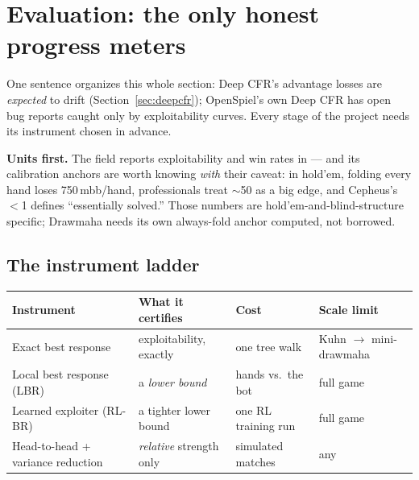\section{Evaluation: the only honest progress meters}\label{sec:evaluation}

One sentence organizes this whole section:  Deep CFR's advantage losses are \emph{expected} to drift (Section~\ref{sec:deepcfr}); OpenSpiel's own Deep CFR has open bug reports caught only by exploitability curves. Every stage of the project needs its instrument chosen in advance.

\textbf{Units first.} The field reports exploitability and win rates in  --- and its calibration anchors are worth knowing \emph{with} their caveat: in hold'em, folding every hand loses 750\,mbb/hand, professionals treat $\sim$50 as a big edge, and Cepheus's $<$1 defines ``essentially solved.'' Those numbers are hold'em-and-blind-structure specific; Drawmaha needs its own always-fold anchor computed, not borrowed.

\subsection*{The instrument ladder}

\begin{center}
\footnotesize
\begin{tabular}{@{}llll@{}}
\toprule
Instrument & What it certifies & Cost & Scale limit \\
\midrule
Exact best response & exploitability, exactly & one tree walk & Kuhn $\to$ mini-drawmaha \\
Local best response (LBR) & a \emph{lower bound} & hands vs.\ the bot & full game \\
Learned exploiter (RL-BR) & a tighter lower bound & one RL training run & full game \\
Head-to-head + variance reduction & \emph{relative} strength only & simulated matches & any \\
\bottomrule
\end{tabular}
\end{center}

